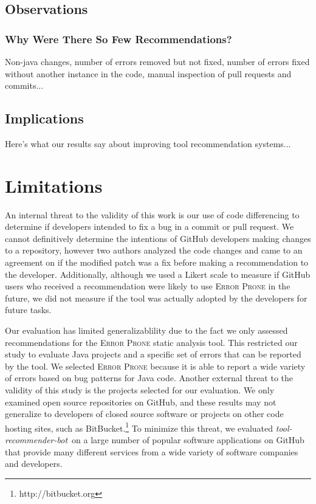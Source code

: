 \documentclass[sigconf,review,anonymous]{acmart}
\newcommand{\tool}{\textsl{tool-recommender-bot}}
\begin{document}
\subsection{Observations}

\subsubsection{Why Were There So Few Recommendations?}

Non-java changes, number of errors removed but not fixed, number of errors fixed without another instance in the code, manual inspection of pull requests and commits...

\subsection{Implications}

Here's what our results say about improving tool recommendation systems...

\section{Limitations}

An internal threat to the validity of this work is our use of code differencing to determine if developers intended to fix a bug in a commit or pull request. We cannot definitively determine the intentions of GitHub developers making changes to a repository, however two authors analyzed the code changes and came to an agreement on if the modified patch was a fix before making a recommendation to the developer. Additionally, although we used a Likert scale to measure if GitHub users who received a recommendation were likely to use \textsc{Error Prone} in the future, we did not measure if the tool was actually adopted by the developers for future tasks.

Our evaluation has limited generalizablility due to the fact we only assessed recommendations for the \textsc{Error Prone} static analysis tool. This restricted our study to evaluate Java projects and a specific set of errors that can be reported by the tool. We selected \textsc{Error Prone} because it is able to report a wide variety of errors based on bug patterns for Java code. Another external threat to the validity of this study is the projects selected for our evaluation. We only examined open source repositories on GitHub, and these results may not generalize to developers of closed source software or projects on other code hosting sites, such as BitBucket.\footnote{http://bitbucket.org} To minimize this threat, we evaluated \tool~on a large number of popular software applications on GitHub that provide many different services from a wide variety of software companies and developers. 
\end{document}
